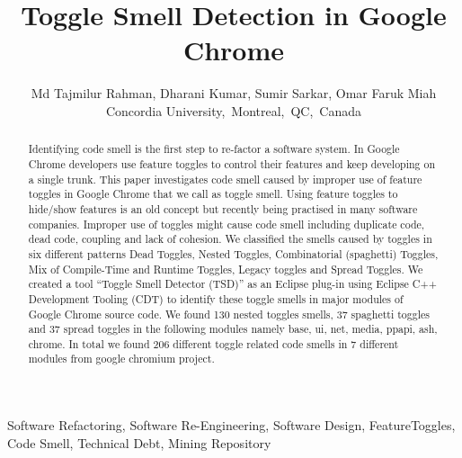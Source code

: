 \documentclass[conference]{IEEEtran}
\begin{document}
\title{Toggle Smell Detection in Google Chrome}
\author{
Md Tajmilur Rahman, Dharani Kumar, Sumir Sarkar, Omar Faruk Miah\\
Concordia University,~Montreal,~QC,~Canada
}
\maketitle

\begin{abstract}
Identifying code smell is the first step to re-factor a software system. 
In Google Chrome developers use feature toggles to control their features 
and keep developing on a single trunk. This paper investigates code smell 
caused by improper use of feature toggles in Google Chrome that we call 
as toggle smell. Using feature toggles to hide/show features is an old 
concept but recently being practised in many software companies. Improper 
use of toggles might cause code smell including duplicate code, dead code, 
coupling and lack of cohesion. We classified the smells caused by toggles 
in six different patterns Dead Toggles, Nested Toggles, Combinatorial (spaghetti) Toggles, 
Mix of Compile-Time and Runtime Toggles, Legacy toggles and Spread Toggles. 
We created a tool ``Toggle Smell Detector (TSD)'' as an Eclipse plug-in using Eclipse C++ Development Tooling (CDT) to identify these toggle 
smells in major modules of Google Chrome source code. We found 130 
nested toggles smells, 37 spaghetti toggles and 37 spread toggles in  the following modules namely base, ui, net, media, ppapi, ash, chrome. In total we found 206 different toggle related code smells in 7 different modules from google chromium project.\\
\end{abstract}

\begin{IEEEkeywords}
Software Refactoring, Software Re-Engineering, Software Design, FeatureToggles, Code Smell, Technical Debt, Mining Repository
\end{IEEEkeywords}
\end{document}
